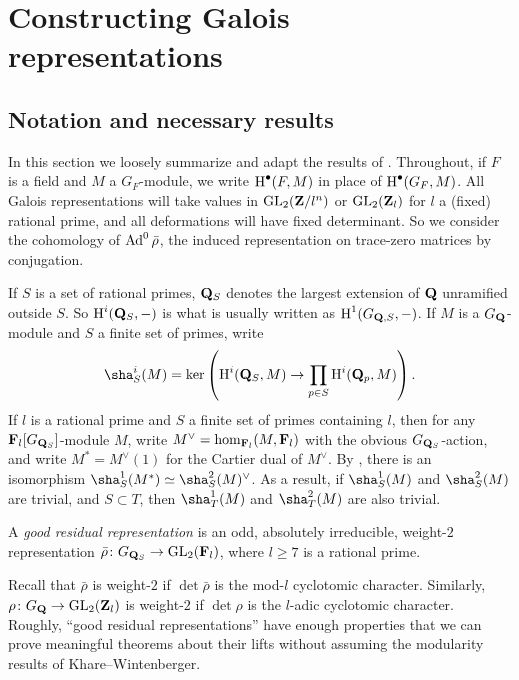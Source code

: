 
\chapter{Constructing Galois representations}\label{ch:construct-Galois}





\section{Notation and necessary results}

In this section we loosely summarize and adapt the results of 
\cite{khare-larsen-ramakrishna-2005,pande-2011}. Throughout, if $F$ is a field 
and $M$ a $G_F$-module, we write $\operatorname{H}^\bullet(F,M)$ in place of 
$\operatorname{H}^\bullet(G_F,M)$. All Galois representations will take values in 
$\operatorname{GL}_2(\mathbf{Z}/l^n)$ or $\operatorname{GL}_2(\mathbf{Z}_l)$ for $l$ a (fixed) rational prime, and 
all deformations will have fixed determinant. So we consider the cohomology of 
$\operatorname{Ad}^0\bar\rho$, the induced representation on trace-zero matrices by 
conjugation. 

If $S$ is a set of rational primes, $\mathbf{Q}_S$ denotes the largest extension of 
$\mathbf{Q}$ unramified outside $S$. So $\operatorname{H}^i(\mathbf{Q}_S,-)$ is what is usually written as 
$\operatorname{H}^1(G_{\mathbf{Q},S},-)$. If $M$ is a $G_{\mathbf{Q}}$-module and $S$ a finite set of primes, 
write 
\[
	\sha^i_S(M) = \ker\left( \h^i(\bQ_S,M) \to \prod_{p\in S} \h^i(\bQ_p,M)\right) .
\]
If $l$ is a rational prime and $S$ a finite set of primes containing $l$, then 
for any $\mathbf{F}_l[G_{\mathbf{Q}_S}]$-module $M$, write $M^\vee=\hom_{\mathbf{F}_l}(M,\mathbf{F}_l)$ 
with the obvious $G_{\mathbf{Q}_S}$-action, and write $M^\ast = M^\vee(1)$ for the 
Cartier dual of $M^\vee$. By \cite[Th.~8.6.7]{neukirch-schmidt-winberg-2008}, 
there is an isomorphism $\sha^1_S(M^\ast) \simeq \sha_S^2(M)^\vee$. As a 
result, if $\sha_S^1(M)$ and $\sha_S^2(M)$ are trivial, and $S\subset T$, then 
$\sha_T^1(M)$ and $\sha_T^2(M)$ are also trivial. 

\begin{definition}
A \emph{good residual representation} is an odd, absolutely irreducible, 
weight-$2$ representation $\bar\rho\colon G_{\mathbf{Q}_S} \to \operatorname{GL}_2(\mathbf{F}_l)$, where 
$l\geqslant 7$ is a rational prime. 
\end{definition}

Recall that $\bar\rho$ is weight-$2$ if $\det\bar\rho$ is the mod-$l$ 
cyclotomic character. Similarly, $\rho\colon G_{\mathbf{Q}} \to \operatorname{GL}_2(\mathbf{Z}_l)$ is 
weight-$2$ if $\det\rho$ is the $l$-adic cyclotomic character. 
Roughly, ``good residual representations'' have enough properties that we can 
prove meaningful theorems about their lifts without assuming the modularity 
results of Khare--Wintenberger. 


